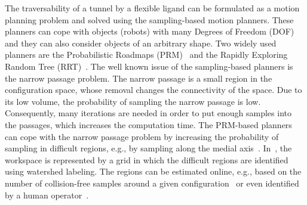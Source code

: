 \documentclass[usletter, 10pt, conference]{ieeeconf} %
\def\qrand{q_{rand}}
\def\qnear{q_{near}}
\def\qnew{q_{new}}
\def\T{\mathcal{T}}
\def\C{\mathcal{C}}
\begin{document}
The traversability of a tunnel by a flexible ligand can be formulated as a motion planning problem and solved using the sampling-based motion planners.
These planners can cope with objects (robots) with many Degrees of Freedom (DOF) and they can also consider objects of an arbitrary shape.
Two widely used planners are the Probabilistic Roadmaps (PRM)~\cite{kavrakiForPP} and the Rapidly Exploring Random Tree (RRT)~\cite{lavalleRRT}.
The well known issue of the sampling-based planners is the narrow passage problem.
The narrow passage is a small region in the configuration space, whose removal changes the connectivity of the space.
Due to its low volume, the probability of sampling the narrow passage is low.
Consequently, many iterations are needed in order to put enough samples into the passages, which increases the computation time.
The PRM-based planners can cope with the narrow passage problem by increasing the probability of sampling in difficult regions, e.g., by sampling along the medial axis~\cite{wilmarthMAPRM}.
In~\cite{bergWIG}, the workspace is represented by a grid in which the difficult regions are identified using watershed labeling.
The regions can be estimated online, e.g., based on the number of collision-free samples around a given configuration~\cite{overmarsGauss,hsuBridge} or even identified by a human operator~\cite{denny2018general}. 
\end{document}

